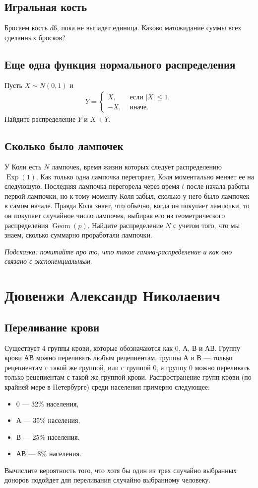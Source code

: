 \documentclass[12pt]{article}
\DeclareMathOperator{\Geom}{Geom}
\DeclareMathOperator{\Exp}{Exp}
\begin{document}
\subsection{Игральная кость}Бросаем кость $d6$, пока не выпадет единица. Каково матожидание суммы всех сделанных бросков?

\subsection{Еще одна функция нормального распределения}
Пусть $X \sim N(0, 1)$ и 
\begin{align*}
    Y = \begin{cases}
        X, &\text{ если } |X| \le 1, \\
        -X, &\text{ иначе.}
    \end{cases}
\end{align*}
Найдите распределение $Y$ и $X + Y$.

\subsection{Сколько было лампочек}
У Коли есть $N$ лампочек, время жизни которых следует распределению $\Exp(1)$. Как только одна лампочка перегорает, Коля моментально меняет ее на следующую. Последняя лампочка перегорела через время $t$ после начала работы первой лампочки, но к тому моменту Коля забыл, сколько у него было лампочек в самом начале. Правда Коля знает, что обычно, когда он покупает лампочки, то он покупает случайное число лампочек, выбирая его из геометрического распределения $\Geom(p)$. Найдите распределение $N$ с учетом того, что мы знаем, сколько суммарно проработали лампочки. 

\emph{Подсказка: почитайте про то, что такое гамма-распределение и как оно связано с экспоненциальным.}

\newpage
\section{Дювенжи Александр Николаевич}

\subsection{Переливание крови}
Существует 4 группы крови, которые обозначаются как 0, А, В и АВ. Группу крови АВ можно переливать любым рецепиентам, группы А и В --- только рецепиентам с такой же группой, или с группой 0, а группу 0 можно переливать только рецепиентам с такой же группой крови. Распространение групп крови (по крайней мере в Петербурге) среди населения примерно следующее:
\begin{itemize}
    \item 0 --- 32\% населения,
    \item А --- 35\% населения,
    \item В --- 25\% населения,
    \item АВ --- 8\% населения.
\end{itemize}
Вычислите вероятность того, что хотя бы один из трех случайно выбранных доноров подойдет для переливания случайно выбранному человеку. 
\end{document}
